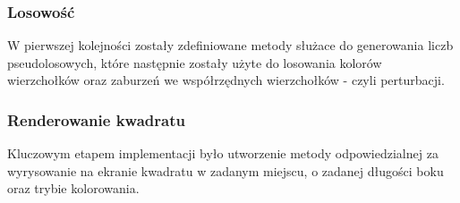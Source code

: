 \documentclass[a4paper,11pt]{article}
\begin{document}
\subsubsection{Losowość}

W pierwszej kolejności zostały zdefiniowane metody służace do generowania liczb pseudolosowych, które następnie zostały użyte do losowania kolorów wierzchołków oraz zaburzeń we współrzędnych wierzchołków - czyli perturbacji.

\subsubsection{Renderowanie kwadratu}

Kluczowym etapem implementacji było utworzenie metody odpowiedzialnej za wyrysowanie na ekranie kwadratu w zadanym miejscu, o zadanej długości boku oraz trybie kolorowania. 
\end{document}
